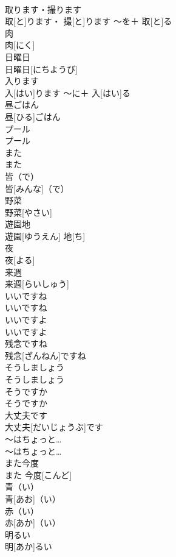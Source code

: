 \documentclass[8pt]{extreport}
\begin{document}
\begin{CJK}{UTF8}{min}
\\	取ります・撮ります	
\\	取[と]ります・ 撮[と]ります	〜を＋ 取[と]る	
\\	肉	
\\	肉[にく]		
\\	日曜日	
\\	日曜日[にちようび]		
\\	入ります	
\\	入[はい]ります	〜に＋ 入[はい]る	
\\	昼ごはん	
\\	昼[ひる]ごはん		
\\	プール	
\\	プール		
\\	また	
\\	また		
\\	皆（で）	
\\	皆[みんな]（で）		
\\	野菜	
\\	野菜[やさい]		
\\	遊園地	
\\	遊園[ゆうえん] 地[ち]		
\\	夜	
\\	夜[よる]		
\\	来週	
\\	来週[らいしゅう]		
\\	いいですね	
\\	いいですね		
\\	いいですよ	
\\	いいですよ		
\\	残念ですね	
\\	残念[ざんねん]ですね		
\\	そうしましょう	
\\	そうしましょう		
\\	そうですか	
\\	そうですか		
\\	大丈夫です	
\\	大丈夫[だいじょうぶ]です		
\\	〜はちょっと…	
\\	〜はちょっと…		
\\	また今度	
\\	また 今度[こんど]		
\\	青（い）	
\\	青[あお]（い）		
\\	赤（い）	
\\	赤[あか]（い）		
\\	明るい	
\\	明[あか]るい		

\end{CJK}
\end{document}
